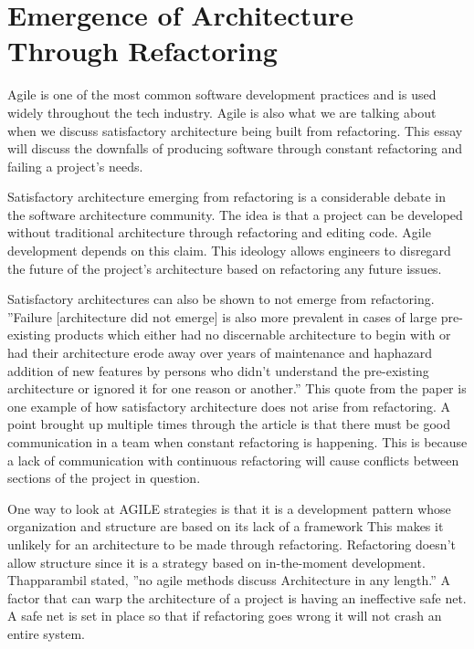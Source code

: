 \documentclass[12pt]{article}
\newcommand\tab[1][1cm]{\hspace*{#1}}
\begin{document}
\maketitle


\section*{\tab  Emergence of Architecture Through Refactoring}
\tab Agile is one of the most common software development practices and is used
widely throughout the tech industry. Agile is also what we are talking about
when we discuss satisfactory architecture being built from refactoring. This
essay will discuss the downfalls of producing software through constant 
refactoring and failing a project’s needs. 

\tab Satisfactory architecture emerging from refactoring is a considerable debate 
in the software architecture community.  The idea is that a project can be 
developed without traditional architecture through refactoring and editing 
code. Agile development depends on this claim. This ideology allows engineers 
to disregard the future of the project’s architecture based on refactoring any 
future issues. 

\tab Satisfactory architectures can also be shown to not emerge from refactoring. 
”Failure [architecture did not emerge] is also more prevalent in cases of large
pre-existing products which either had no discernable architecture to begin 
with or had their architecture erode away over years of maintenance and 
haphazard addition of new features by persons who didn’t  understand the 
pre-existing architecture or ignored it for one reason or another.”  This 
quote from the paper is one example of how satisfactory architecture does 
not arise from refactoring.  A point brought up multiple times through the 
article is that there must be good communication in a team when constant 
refactoring is happening.  This is because a lack of communication with 
continuous refactoring will cause conflicts between sections of the project 
in question. 

\tab One way to look at AGILE strategies is that it is a development pattern whose 
organization and structure are based on its lack of a framework This makes 
it unlikely for an architecture to be made through refactoring. Refactoring 
doesn’t allow structure since it is a strategy based on in-the-moment 
development. Thapparambil stated, ”no agile methods discuss Architecture in 
any length.” A factor that can warp the architecture of a project is having 
an ineffective safe net. A safe net is set in place so that if refactoring 
goes wrong it will not crash an entire system.
\end{document}
